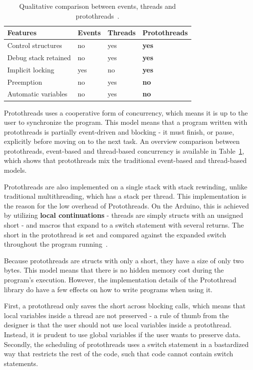 \begin{table}[htb!]
  \centering
  \begin{tabular}{lll>{\bfseries}l}
    \toprule
    Features             & Events & Threads & Protothreads \\ \midrule
    Control structures   & no     & yes     & yes          \\
    Debug stack retained & no     & yes     & yes          \\
    Implicit locking     & yes    & no      & yes          \\
    Preemption           & no     & yes     & no           \\
    Automatic variables  & no     & yes     & no
  \end{tabular}
  \caption{Qualitative comparison between events, threads and protothreads~\cite{dunkels05using}.}
  \label{tab:protothreadscomparison}
\end{table}


Protothreads uses a cooperative form of concurrency, which means it is up to the user to synchronize the program. This model means that a program written with protothreads is partially event-driven and blocking - it must finish, or pause, explicitly before moving on to the next task. An overview comparison between protothreads, event-based and thread-based concurrency is available in Table~\ref{tab:protothreadscomparison}, which shows that protothreads mix the traditional event-based and thread-based models.

Protothreads are also implemented on a single stack with stack rewinding, unlike traditional multithreading, which has a stack per thread. This implementation is the reason for the low overhead of Protothreads. On the Arduino, this is achieved by utilizing \textbf{local continuations} - threads are simply structs with an unsigned short - and macros that expand to a switch statement with several returns. The short in the protothread is set and compared against the expanded switch throughout the program running~\cite{AdamDunkelProtothreads}.




Because protothreads are structs with only a short, they have a size of only two bytes. This model means that there is no hidden memory cost during the program's execution. However, the implementation details of the Protothread library do have a few effects on how to write programs when using it.

First, a protothread only saves the short across blocking calls, which means that local variables inside a thread are not preserved - a rule of thumb from the designer is that the user should not use local variables inside a protothread. Instead, it is prudent to use global variables if the user wants to preserve data.
Secondly, the scheduling of protothreads uses a switch statement in a bastardized way that restricts the rest of the code, such that code cannot contain switch statements.

